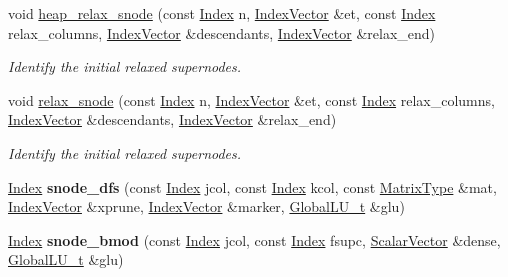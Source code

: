 \begin{DoxyCompactItemize}
void \hyperlink{group___sparse_l_u___module_a88952ce33c968374b149e31d0539178d}{heap\+\_\+relax\+\_\+snode} (const \hyperlink{namespace_eigen_a62e77e0933482dafde8fe197d9a2cfde}{Index} n, \hyperlink{group___core___module}{Index\+Vector} \&et, const \hyperlink{namespace_eigen_a62e77e0933482dafde8fe197d9a2cfde}{Index} relax\+\_\+columns, \hyperlink{group___core___module}{Index\+Vector} \&descendants, \hyperlink{group___core___module}{Index\+Vector} \&relax\+\_\+end)
\begin{DoxyCompactList}\small\item\em Identify the initial relaxed supernodes. \end{DoxyCompactList}\item 
void \hyperlink{group___sparse_l_u___module_a33672df380f94e774c5a6919d3474af4}{relax\+\_\+snode} (const \hyperlink{namespace_eigen_a62e77e0933482dafde8fe197d9a2cfde}{Index} n, \hyperlink{group___core___module}{Index\+Vector} \&et, const \hyperlink{namespace_eigen_a62e77e0933482dafde8fe197d9a2cfde}{Index} relax\+\_\+columns, \hyperlink{group___core___module}{Index\+Vector} \&descendants, \hyperlink{group___core___module}{Index\+Vector} \&relax\+\_\+end)
\begin{DoxyCompactList}\small\item\em Identify the initial relaxed supernodes. \end{DoxyCompactList}\item 
\mbox{\label{group___sparse_l_u___module_a75c5a4b5a17643e243e11741df018470}} 
\hyperlink{namespace_eigen_a62e77e0933482dafde8fe197d9a2cfde}{Index} {\bfseries snode\+\_\+dfs} (const \hyperlink{namespace_eigen_a62e77e0933482dafde8fe197d9a2cfde}{Index} jcol, const \hyperlink{namespace_eigen_a62e77e0933482dafde8fe197d9a2cfde}{Index} kcol, const \hyperlink{group___sparse_core___module}{Matrix\+Type} \&mat, \hyperlink{group___core___module}{Index\+Vector} \&xprune, \hyperlink{group___core___module}{Index\+Vector} \&marker, \hyperlink{struct_eigen_1_1internal_1_1_l_u___global_l_u__t}{Global\+L\+U\+\_\+t} \&glu)
\item 
\mbox{\label{group___sparse_l_u___module_a2d835179cc3dcf09ff14ab3c8f0d9415}} 
\hyperlink{namespace_eigen_a62e77e0933482dafde8fe197d9a2cfde}{Index} {\bfseries snode\+\_\+bmod} (const \hyperlink{namespace_eigen_a62e77e0933482dafde8fe197d9a2cfde}{Index} jcol, const \hyperlink{namespace_eigen_a62e77e0933482dafde8fe197d9a2cfde}{Index} fsupc, \hyperlink{group___core___module}{Scalar\+Vector} \&dense, \hyperlink{struct_eigen_1_1internal_1_1_l_u___global_l_u__t}{Global\+L\+U\+\_\+t} \&glu)

\end{DoxyCompactItemize}
